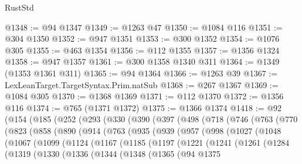 \begin{lexlean}{RustStd}
\begin{coremodule}
@1348 := @94 @1347
@1349 := @1263 @47
@1350 := @1084 @116
@1351 := @304 @1350
@1352 := @947 @1351
@1353 := @300 @1352
@1354 := @1076 @305
@1355 := @463 @1354
@1356 := @112 @1355
@1357 := @1356 @1324
@1358 := @947 @1357
@1361 := @300 @1358 @1340 @311
@1364 := @1349 (@1353 @1361 @311)
@1365 := @94 @1364
@1366 := @1263 @39
@1367 := LexLeanTarget.TargetSyntax.Prim.natSub
@1368 := @267 @1367
@1369 := @1084 @305
@1370 := @1368 @1369
@1371 := @112 @1370
@1372 := @1356 @116
@1374 := @765 (@1371 @1372)
@1375 := @1366 @1374
@1418 := @92
    (@154
      (@185
        (@252
          (@293
            (@330
              (@390
                (@397
                  (@498
                    (@718
                      (@746
                        (@763
                          (@770
                            (@823
                              (@858
                                (@890
                                  (@914
                                    (@763
                                      (@935
                                        (@939
                                          (@957
                                            (@998
                                              (@1027
                                                (@1048
                                                  (@1067
                                                    (@1099
                                                      (@1124
                                                        (@1167
                                                          (@1185
                                                            (@1197
                                                              (@1221
                                                                (@1241
                                                                  (@1261
                                                                    (@1284
                                                                      (@1319
                                                                        (@1330
                                                                          (@1336
                                                                            (@1344
                                                                              (@1348
                                                                                (@1365
                                                                                  (@94
                                                                                    @1375

\end{coremodule}
\end{lexlean}
